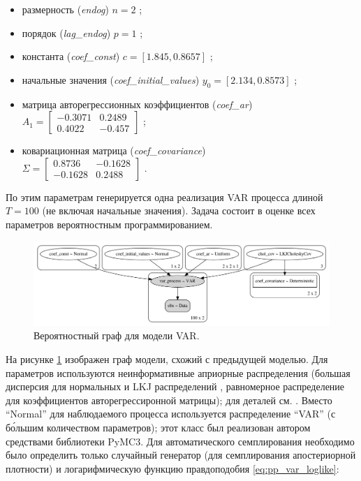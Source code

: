 \documentclass[a4paper,14pt]{extreport}
\begin{document}
\begin{itemize}
	\item размерность (\textit{endog}) $n=2$ ;
	\item порядок (\textit{lag\_endog}) $p=1$ ;
	\item константа (\textit{coef\_const}) $c=[1.845, 0.8657]$ ;
	\item начальные значения (\textit{coef\_initial\_values}) $y_0=[2.134, 0.8573]$ ;
	\item матрица авторегрессионных коэффициентов (\textit{coef\_ar}) \\ $ A_1 = \begin{bmatrix} -0.3071 & 0.2489 \\ 0.4022 & -0.457 \end{bmatrix} $ ;
	\item ковариационная матрица (\textit{coef\_covariance}) \\ $ \Sigma = \begin{bmatrix} 0.8736 & -0.1628 \\ -0.1628 & 0.2488 \end{bmatrix} $ .
\end{itemize}

По этим параметрам генерируется одна реализация VAR процесса длиной $T=100$ (не включая начальные значения). Задача состоит в оценке всех параметров вероятностным программированием.

\begin{figure}[H]
	\includegraphics[width=\linewidth]{img/gen/pp_var_graph.png}
	\caption{Вероятностный граф для модели VAR. }
	\label{fig:pp_var_graph}
\end{figure}

На рисунке \ref{fig:pp_var_graph} изображен граф модели, схожий с предыдущей моделью. Для параметров используются неинформативные априорные распределения (большая дисперсия для нормальных и LKJ распределений \cite{lkj_prior}, равномерное распределение для коэффициентов авторегрессиронной матрицы); для деталей см. . Вместо ``Normal'' для наблюдаемого процесса используется распределение ``VAR'' (с б\'{о}льшим количеством параметров); этот класс был реализован автором средствами библиотеки PyMC3. Для автоматического семплирования необходимо было определить только случайный генератор (для семплирования апостериорной плотности) и логарифмическую функцию правдоподобия \eqref{eq:pp_var_loglike}:
\end{document}
